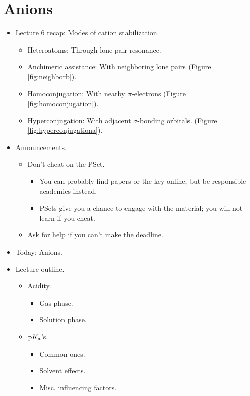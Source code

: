 \documentclass[../notes.tex]{subfiles}
\begin{document}
\section{Anions}
\begin{itemize}
    \item {}Lecture 6 recap: Modes of cation stabilization.
    \begin{itemize}
        \item Heteroatoms: Through lone-pair resonance.
        \item Anchimeric assistance: With neighboring lone pairs (Figure \ref{fig:neighborb}).
        \item Homoconjugation: With nearby $\pi$-electrons (Figure \ref{fig:homoconjugation}).
        \item Hyperconjugation: With adjacent $\sigma$-bonding orbitals. (Figure \ref{fig:hyperconjugationa}).
    \end{itemize}
    \item Announcements.
    \begin{itemize}
        \item Don't cheat on the PSet.
        \begin{itemize}
            \item You can probably find papers or the key online, but be responsible academics instead.
            \item PSets give you a chance to engage with the material; you will not learn if you cheat.
        \end{itemize}
        \item Ask for help if you can't make the deadline.
    \end{itemize}
    \pagebreak
    \item Today: Anions.
    \item Lecture outline.
    \begin{itemize}
        \item Acidity.
        \begin{itemize}
            \item Gas phase.
            \item Solution phase.
        \end{itemize}
        \item $\textup{p}K_\textup{a}$'s.
        \begin{itemize}
            \item Common ones.
            \item Solvent effects.
            \item Misc. influencing factors.

\end{itemize}
\end{itemize}
\end{itemize}
\end{document}
